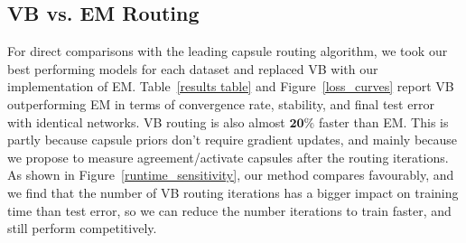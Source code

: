 \documentclass[letterpaper]{article} \usepackage{aaai20}  \usepackage{times}  \usepackage{helvet} \usepackage{courier}  \usepackage[hyphens]{url}  \usepackage{graphicx} \urlstyle{rm} \def\UrlFont{\rm}  \usepackage{graphicx}  \frenchspacing  \setlength{\pdfpagewidth}{8.5in}  \setlength{\pdfpageheight}{11in}  \nocopyright
\begin{document}
\subsection{VB vs. EM Routing}
For direct comparisons with the leading capsule routing algorithm, we took our best performing models for each dataset and replaced VB with our implementation of EM. Table~\ref{results table} and Figure~\ref{loss_curves} report VB outperforming EM in terms of convergence rate, stability, and final test error with identical networks. VB routing is also almost $\mathbf{20}\%$ faster than EM. This is partly because capsule priors don't require gradient updates, and mainly because we propose to measure agreement/activate capsules after the routing iterations. As shown in Figure~\ref{runtime_sensitivity}, our method compares favourably, and we find that the number of VB routing iterations has a bigger impact on training time than test error, so we can reduce the number iterations to train faster, and still perform competitively.
\end{document}

